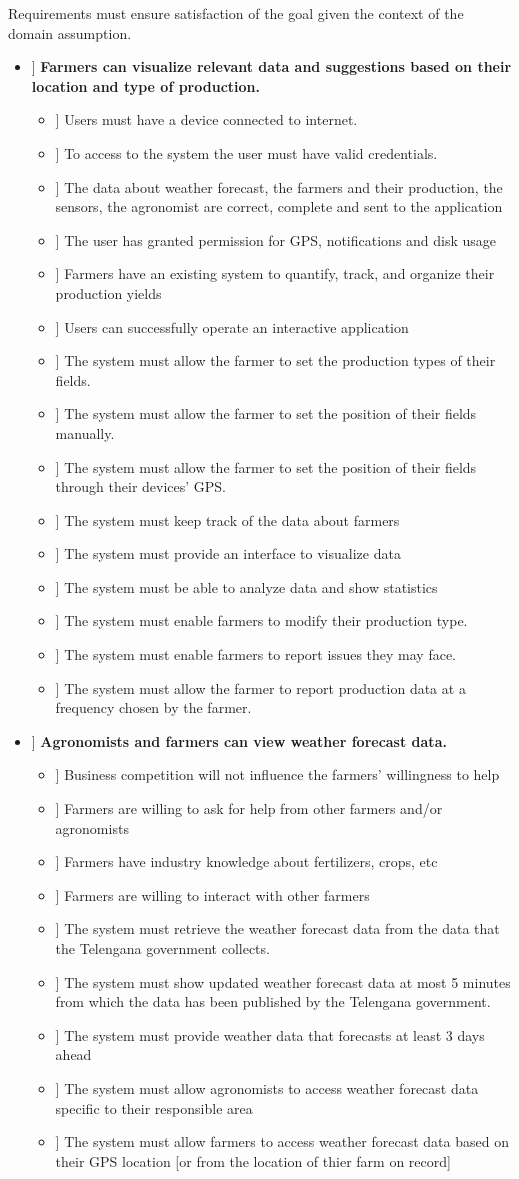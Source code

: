 \newcommand\goal[1]{\item[[ G#1]]}
\newcommand\dom[1]{\item[[ D#1]]}
\newcommand\req[1]{\item[[ R#1]]}

Requirements must ensure satisfaction of the goal given the context of the domain assumption.


\begin{itemize}
\goal{1} \textbf{Farmers can visualize relevant data and suggestions based on their location and type of production.}

\begin{itemize}
\dom{1}  Users must have a device connected to internet.
\dom{2} To access to the system the user must have valid credentials.
\dom{3} The data about weather forecast, the farmers and their production, the sensors, the agronomist are correct, complete and sent to the application
\dom{4} The user has granted permission for GPS, notifications and disk usage
\dom{5} Farmers have an existing system to quantify, track, and organize their production yields
\dom{6} Users can successfully operate an interactive application

\req{1} The system must allow the farmer to set the production types of their fields.
\req{2} The system must allow the farmer to set the position of their fields manually.
\req{3} The system must allow the farmer to set the position of their fields through their devices' GPS.
\req{4} The system must keep track of the data about farmers
\req{5} The system must provide an interface to visualize data
\req{6} The system must be able to analyze data and show statistics
\req{7} The system must enable farmers to modify their production type.
\req{8} The system must enable farmers to report issues they may face. 
\req{9} The system must allow the farmer to report production data at a frequency chosen by the farmer.
\end{itemize}

\goal{2}  \textbf{Agronomists and farmers can view weather forecast data.}

\begin{itemize}
\dom{7} Business competition will not influence the farmers' willingness to help
\dom{8} Farmers are willing to ask for help from other farmers and/or agronomists
\dom{9} Farmers have industry knowledge about fertilizers, crops, etc 
\dom{10} Farmers are willing to interact with other farmers 

\req{10} The system must retrieve the weather forecast data from the data that the Telengana government collects.
\req{11} The system must show updated weather forecast data at most 5 minutes from which the data has been published by the Telengana government.
\req{12} The system must provide weather data that forecasts at least 3 days ahead
\req{13} The system must allow agronomists to access weather forecast data specific to their responsible area
\req{14} The system must allow farmers to access weather forecast data based on their GPS location [or from the location of thier farm on record]


\end{itemize}
\end{itemize}
